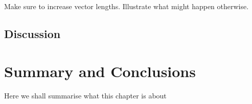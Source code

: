 \documentclass[12pt]{report}
\newcommand{\todo}[1]{{\leavevmode\color{todo}#1}}
\begin{document}
\todo{Make sure to increase vector lengths. Illustrate what might happen otherwise.}

\section{Discussion}


\chapter{Summary and Conclusions}
\todo{Here we shall summarise what this chapter is about}





\end{document}
